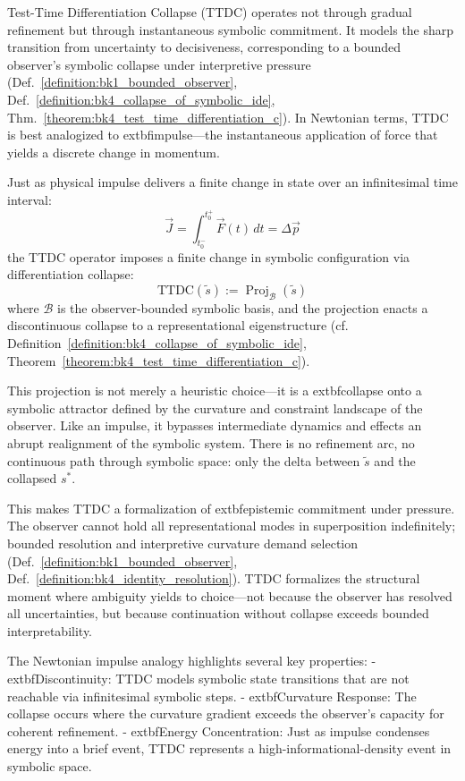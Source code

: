 \begin{scholium}
\label{scholium:bk4_ttdc_impulse_collapse}
Test-Time Differentiation Collapse (TTDC) operates not through gradual refinement but through instantaneous symbolic commitment. It models the sharp transition from uncertainty to decisiveness, corresponding to a bounded observer's symbolic collapse under interpretive pressure (Def.~\ref{definition:bk1_bounded_observer}, Def.~\ref{definition:bk4_collapse_of_symbolic_ide}, Thm.~\ref{theorem:bk4_test_time_differentiation_c}). In Newtonian terms, TTDC is best analogized to 	extbf{impulse}---the instantaneous application of force that yields a discrete change in momentum.

Just as physical impulse delivers a finite change in state over an infinitesimal time interval:
\[
\vec{J} = \int_{t_0^-}^{t_0^+} \vec{F}(t)\,dt = \Delta \vec{p}
\]
the TTDC operator imposes a finite change in symbolic configuration via differentiation collapse:
\[
\mathrm{TTDC}(\tilde{s}) := \operatorname{Proj}_{\mathcal{B}}(\tilde{s})
\]
where $\mathcal{B}$ is the observer-bounded symbolic basis, and the projection enacts a discontinuous collapse to a representational eigenstructure (cf. Definition~\ref{definition:bk4_collapse_of_symbolic_ide}, Theorem~\ref{theorem:bk4_test_time_differentiation_c}).

This projection is not merely a heuristic choice---it is a 	extbf{collapse onto a symbolic attractor} defined by the curvature and constraint landscape of the observer. Like an impulse, it bypasses intermediate dynamics and effects an abrupt realignment of the symbolic system. There is no refinement arc, no continuous path through symbolic space: only the delta between $\tilde{s}$ and the collapsed $s^*$.

This makes TTDC a formalization of 	extbf{epistemic commitment under pressure}. The observer cannot hold all representational modes in superposition indefinitely; bounded resolution and interpretive curvature demand selection (Def.~\ref{definition:bk1_bounded_observer}, Def.~\ref{definition:bk4_identity_resolution}). TTDC formalizes the structural moment where ambiguity yields to choice---not because the observer has resolved all uncertainties, but because continuation without collapse exceeds bounded interpretability.

The Newtonian impulse analogy highlights several key properties:
- 	extbf{Discontinuity:} TTDC models symbolic state transitions that are not reachable via infinitesimal symbolic steps.
- 	extbf{Curvature Response:} The collapse occurs where the curvature gradient exceeds the observer's capacity for coherent refinement.
- 	extbf{Energy Concentration:} Just as impulse condenses energy into a brief event, TTDC represents a high-informational-density event in symbolic space.


\end{scholium}

